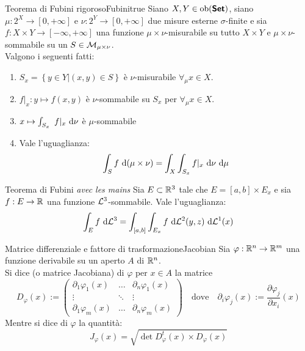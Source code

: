 \documentclass{article}
\begin{document}
\begin{theorem}{Teorema di Fubini rigoroso}{Fubinitrue}
    Siano $X, Y \in \operatorname{ob}(\text{\sffamily\textbf{Set}})$, siano  $\mu : 2^X \to [0,+\infty]$ e $\nu : 2^Y \to [0,+\infty]$ due misure esterne $\sigma$-finite e sia $f : X\times Y \to [-\infty,+\infty]$ una funzione $\mu \times \nu$-misurabile su tutto $X\times Y$ e $\mu \times \nu$-sommabile su un $S \in \mathcal{M}_{\mu \times \nu}$.\\
    Valgono i seguenti fatti:\begin{enumerate}
        \item $S_x = \left\{ y \in Y | (x,y) \in S \right\}$ è $\nu$-misurabile $\forall_\mu x \in X$.
        \item $f|_x : y \mapsto f(x,y)$ è $\nu$-sommabile su $S_x$ per $\forall_\mu x \in X$.
        \item $x\mapsto \int_{S_x}\ f|_x \text{ d}\nu$ è $\mu$-sommabile
        \item Vale l'uguaglianza:
        \[\int_S f \text{ d}(\mu\times\nu) = \int_X \int_{S_x} f|_x \text{ d}\nu \text{ d}\mu\] 
    \end{enumerate}
\end{theorem}

\begin{proposition}{Teorema di Fubini \it{avec les mains}}{}
    Sia $E \subset \mathbb{R}^3$ tale che $E = [a,b]\times E_x$ e sia $f : E \to \mathbb{R}$ una funzione $\mathcal{L}^3$-sommabile. Vale l'uguaglianza:
    \[\int_E f \text{ d} \mathcal{L}^3 = \int_{[a,b]}\int_{E_x} f \text{ d} \mathcal{L}^2(y,z) \text{ d} \mathcal{L}^1(x)\] 
\end{proposition}

\begin{definition}{Matrice differenziale e fattore di trasformazione}{Jacobian}
    Sia $\varphi : \mathbb{R}^n \to \mathbb{R}^m$ una funzione derivabile su un aperto $A$ di $\mathbb{R}^n$.\\
    Si dice  (o matrice Jacobiana) di $\varphi$ per $x \in A$ la matrice
    \[D_\varphi(x) := \begin{pmatrix}
        \partial_1 \varphi_1 (x) & \dots & \partial_n \varphi_1 (x)\\
        \vdots & \ddots & \vdots \\
        \partial_1 \varphi_m (x) & \dots & \partial_n \varphi_m (x)
    \end{pmatrix} \quad \text{dove} \quad \partial_i \varphi_j(x) := \frac{\partial \varphi_j}{\partial x_i}(x)\]
    Mentre si dice  di $\varphi$ la quantità:
    \[J_\varphi(x) = \sqrt{ \det{ D_\varphi^t (x) \times D_\varphi(x) } }\]
\end{definition}
\end{document}
